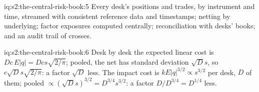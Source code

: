 \begin{solution}{iq:s2:the-central-risk-book:5}
Every desk's positions and trades, by instrument and time, streamed with consistent reference data and timestamps; netting by underlying; factor
exposures computed centrally; reconciliation with desks' books; and an audit trail of crosses.
\end{solution}

\begin{solution}{iq:s2:the-central-risk-book:6}
Desk by desk the expected linear cost is $D c\,E|q| = D c s\sqrt{2/\pi}$; pooled, the net has standard deviation $\sqrt D s$, so $c\sqrt D s\sqrt{2/\pi}$:
a factor $\sqrt D$ less. The impact cost is $k E|q|^{3/2} \propto s^{3/2}$ per desk, $D$ of them; pooled $\propto (\sqrt D s)^{3/2} = D^{3/4}s^{3/2}$:
a factor $D/D^{3/4} = D^{1/4}$ less.
\end{solution}

